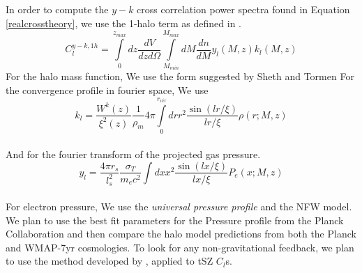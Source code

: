 In order to compute the $y - k$ cross correlation power spectra found in Equation
\ref{realcrosstheory}, we use the 1-halo term as defined in \cite{haloreview}.
\begin{equation}
  C_l^{y-k,1h} = \int\limits_0^{z_{max}} dz \frac{dV}{dz d\Omega} \int\limits_{M_{min}}^{M_{max}} dM \frac{dn}{dM} y_l (M, z) k_l (M,z)
\end{equation}
For the halo mass function, We use the form suggested by Sheth and Tormen \cite{massfunctionsheth}
For the convergence profile in fourier space, We use
\begin{equation}
  k_l = \frac{W^k(z)}{\xi^2(z)} \frac{1}{\rho_m} 4 \pi \int\limits_0 ^{r_{vir}} dr r^2 \frac{\sin(lr/\xi)}{lr/\xi} \rho(r;M,z)
\end{equation}
   \\
And for the fourier transform of the projected gas pressure.
\begin{equation}
    y_l = \frac{4 \pi r_s}{l^2_s} \frac{\sigma_T}{m_e c^2} \int dx x^2  \frac{\sin(lx/\xi)}{lx/\xi} P_e(x;M,z)
\end{equation}
\\
For electron pressure, We use the \emph{universal pressure profile} and the NFW model. 
We plan to use the best fit parameters for the Pressure profile from the Planck Collaboration
and then compare the halo model predictions from both the Planck and WMAP-7yr cosmologies. To look
for any non-gravitational feedback, we plan to use the method developed by \cite{subhapaper},
applied to tSZ $C_l$s.


